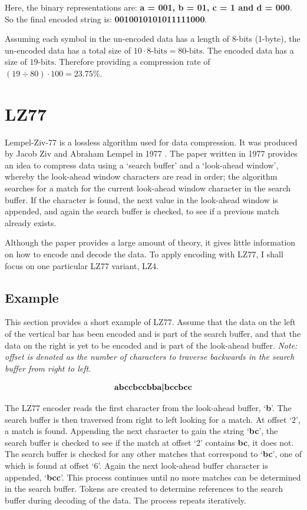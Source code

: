 \documentclass[12pt]{article}
\begin{document}
	Here, the binary representations are: \textbf{a = 001, b = 01, c = 1 and d = 000}. So the final encoded string is: \textbf{0010010101011111000}.
	
	Assuming each symbol in the un-encoded data has a length of 8-bits (1-byte), the un-encoded data has a total size of $10\cdot8 \text{-bits} = 80\text{-bits}$. The encoded data has a size of $19\text{-bits}$. Therefore providing a compression rate of $(19\div80)\cdot100 = 23.75\%$.
	
	\section{LZ77}

	Lempel-Ziv-77 is a lossless algorithm used for data compression. It was produced by Jacob Ziv and Abraham Lempel in 1977 \citep{lz77}. The paper written in 1977 provides an idea to compress data using a `search buffer' and a `look-ahead window', whereby the look-ahead window characters are read in order; the algorithm searches for a match for the current look-ahead window character in the search buffer. If the character is found, the next value in the look-ahead window is appended, and again the search buffer is checked, to see if a previous match already exists.
	
	Although the paper \citep{lz77} provides a large amount of theory, it gives little information on how to encode and decode the data. To apply encoding with LZ77, I shall focus on one particular LZ77 variant, LZ4.
	
	\subsection{Example}
	This section provides a short example of LZ77. Assume that the data on the left of the vertical bar has been encoded and is part of the search buffer, and that the data on the right is yet to be encoded and is part of the look-ahead buffer. \emph{Note: offset is denoted as the number of characters to traverse backwards in the search buffer from right to left}.
	
	\begin{equation*}
		\textbf{abccbccbba\textbar bccbcc}
	\end{equation*}
	
	The LZ77 encoder reads the first character from the look-ahead buffer, `\textbf{b}'. The search buffer is then traversed from right to left looking for a match. At offset `2', a match is found. Appending the next character to gain the string `\textbf{bc}', the search buffer is checked to see if the match at offset `2' contains \textbf{bc}, it does not. The search buffer is checked for any other matches that correspond to `\textbf{bc}', one of which is found at offset `6'. Again the next look-ahead buffer character is appended, `\textbf{bcc}'. This process continues until no more matches can be determined in the search buffer. Tokens are created to determine references to the search buffer during decoding of the data. The process repeats iteratively.
	
\end{document}
